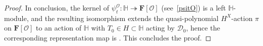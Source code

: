 \begin{proof}
In conclusion, the kernel of $\psi_t^\mathcal{O}\colon \mathbb{H}\twoheadrightarrow\mathbf{F}[\mathcal{O}]$ (see~\eqref{psitO})
is a left $\mathbb{H}$-module, and the resulting isomorphism 
extends the quasi-polynomial $H^X$-action $\pi$ on $\mathbf{F}[\mathcal{O}]$ to an action of $\mathbb{H}$ with $T_0\in H\subset\mathbb{H}$ acting by
$\mathcal{D}_0$, hence the corresponding representation map is . This concludes the proof.
\end{proof}
